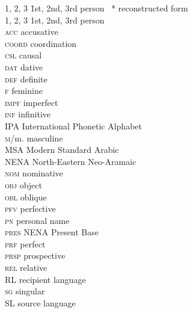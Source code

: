 \documentclass[output=paper]{langsci/langscibook}
\begin{document}
\begin{multicols}{2}
\begin{tabbing}
\textsc{1, 2, 3} \= 1st, 2nd, 3rd person~\kill
*  \>  reconstructed form\\
\textsc{1, 2, 3} \> 1st, 2nd, 3rd person \\
\textsc{acc} \> accusative\\
\textsc{coord} \> {coordination}\\
\textsc{csl} \> causal \\
\textsc{dat} \> dative\\
\textsc{def} \> {definite}\\
\textsc{f} \> feminine\\
\textsc{impf} \> imperfect\\
\textsc{inf} \> {infinitive}\\
IPA \> International Phonetic Alphabet\\
\textsc{m}/m. \> masculine\\
MSA \> Modern Standard Arabic\\
NENA \> North-Eastern Neo-Aramaic\\
\textsc{nom} \> nominative\\
\textsc{obj} \> object \\
\textsc{obl} \> oblique \\
\textsc{pfv} \> perfective\\
\textsc{pn} \> personal name \\
\textsc{pres}    \> NENA Present Base \\
\textsc{prf} \> perfect\\
\textsc{prsp} \> {prospective}\\
\textsc{rel} \> {relative}\\
{RL} \> {recipient language}\\
\textsc{sg} \> singular\\
{SL} \> {source language}\\
\end{tabbing}%
\end{multicols}


\sloppy
\printbibliography[heading=subbibliography,notkeyword=this]
\end{document}
